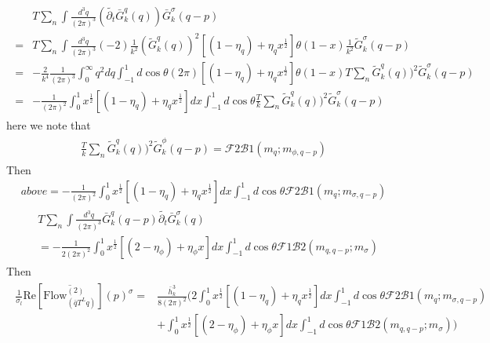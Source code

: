 \documentclass[12pt]{article}
\begin{document}
\begin{eqnarray}
\begin{split}
&T \sum_n\int \frac{d^3q}{(2 \pi)^3}(\tilde{\partial_t}  \bar G^q_k (q)) \bar G^{\sigma}_k(q-p)\\
=&T \sum_n \int \frac{d^3q}{(2 \pi)^3} (-2)\frac{1}{k^2} (\tilde G^q_k(q))^2 [(1-\eta_q)+\eta_q x^{\frac{1}{2}}]\theta(1-x)\frac{1}{k^2} \tilde G^{\sigma}_k(q-p) \\
=& -\frac{2}{k^4} \frac{1}{(2\pi)^3}\int_0^{\infty} q^2 dq \int_{-1}^{1} d \cos \theta  (2\pi)[(1-\eta_q)+\eta_q x^{\frac{1}{2}}]\theta(1-x) T \sum_n \tilde G^q_k(q))^2 \tilde G^{\sigma}_k(q-p) \\
=&-\frac{1}{(2 \pi)^2} \int_{0}^{1}  x^{\frac{1}{2}}[(1-\eta_q)+\eta_q x^{\frac{1}{2}}] dx \int_{-1}^{1} d \cos \theta \frac{T}{k} \sum_n \tilde G^q_k(q))^2 \tilde G^{\sigma}_k(q-p) 
\end{split}
\end{eqnarray}
here we note that
\begin{eqnarray}
\begin{split}
\frac{T}{k} \sum_n \tilde G^q_k(q))^2 \tilde G^{\phi}_k(q-p)  =\mathcal{F}2\mathcal{B}1(m_q;m_{\phi,q-p})
\end{split}
\end{eqnarray}
Then
\begin{eqnarray}
above=-\frac{1}{(2 \pi)^2} \int_{0}^{1}  x^{\frac{1}{2}}[(1-\eta_q)+\eta_q x^{\frac{1}{2}}] dx \int_{-1}^{1} d \cos \theta \mathcal{F}2\mathcal{B}1(m_q;m_{\sigma,q-p})
\end{eqnarray}
\begin{eqnarray}
\begin{split}
&T \sum_n\int \frac{d^3q}{(2 \pi)^3}\bar G^q_k (q-p)\tilde{\partial_t}  \bar G^{\sigma}_k(q)\\
&=-\frac{1}{2(2 \pi)^2}\int_0^1 x^{\frac{1}{2}}[(2-\eta_\phi)+\eta_\phi x] dx\int_{-1}^{1} d\cos \theta \mathcal{F}1\mathcal{B}2(m_{q,q-p};m_{\sigma})
\end{split}
\end{eqnarray}
Then
\begin{eqnarray}
\begin{split}
\frac{1}{\sigma_l} \text{Re} [ \overline{\text{Flow}^{(2)}_{(\bar q T^L q)}}](p)^\sigma=&\frac{\bar h_k^3 }{8 (2 \pi)^2}\bigg (2 \int_{0}^{1}  x^{\frac{1}{2}}[(1-\eta_q)+\eta_q x^{\frac{1}{2}}] dx \int_{-1}^{1} d \cos \theta \mathcal{F}2\mathcal{B}1(m_q;m_{\sigma,q-p})\\
&+\int_0^1 x^{\frac{1}{2}}[(2-\eta_\phi)+\eta_\phi x] dx\int_{-1}^{1} d\cos \theta \mathcal{F}1\mathcal{B}2(m_{q,q-p};m_{\sigma}) \bigg )
\end{split}
\end{eqnarray}
\end{document}
